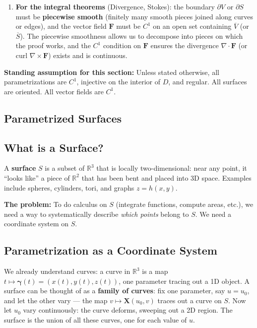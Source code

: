 \documentclass[11pt]{report}
\newcommand{\R}{\mathbb{R}}
\begin{document}
\begin{note}
\begin{enumerate}[itemsep=4pt]
    \item \textbf{For the integral theorems} (Divergence, Stokes): the boundary $\partial V$ or $\partial S$ must be \textbf{piecewise smooth} (finitely many smooth pieces joined along curves or edges), and the vector field $\mathbf{F}$ must be $C^1$ on an open set containing $\overline{V}$ (or $\overline{S}$). The piecewise smoothness allows us to decompose into pieces on which the proof works, and the $C^1$ condition on $\mathbf{F}$ ensures the divergence $\nabla \cdot \mathbf{F}$ (or curl $\nabla \times \mathbf{F}$) exists and is continuous.
\end{enumerate}

\textbf{Standing assumption for this section:} Unless stated otherwise, all parametrizations are $C^1$, injective on the interior of $D$, and regular. All surfaces are oriented. All vector fields are $C^1$.
\end{note}

\subsection{Parametrized Surfaces}

\subsection*{What is a Surface?}

A \textbf{surface} $S$ is a subset of $\R^3$ that is locally two-dimensional: near any point, it ``looks like'' a piece of $\R^2$ that has been bent and placed into 3D space. Examples include spheres, cylinders, tori, and graphs $z = h(x,y)$.

\textbf{The problem:} To do calculus on $S$ (integrate functions, compute areas, etc.), we need a way to systematically describe \textit{which points} belong to $S$. We need a coordinate system on $S$.

\subsection*{Parametrization as a Coordinate System}

We already understand curves: a curve in $\R^3$ is a map $t \mapsto \boldsymbol{\gamma}(t) = (x(t), y(t), z(t))$, one parameter tracing out a 1D object. A surface can be thought of as a \textbf{family of curves}: fix one parameter, say $u = u_0$, and let the other vary --- the map $v \mapsto \mathbf{X}(u_0, v)$ traces out a curve on $S$. Now let $u_0$ vary continuously: the curve deforms, sweeping out a 2D region. The surface is the union of all these curves, one for each value of $u$.
\end{document}
